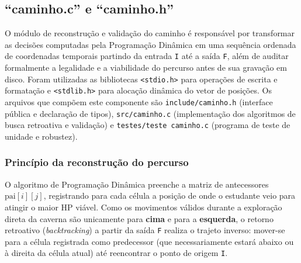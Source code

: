 \documentclass[12pt,a4paper]{article}
\makeatletter
\DeclareRobustCommand{\_}{%
  \ifmmode
    \nfss@text{\textunderscore}%
  \else
    \textunderscore\allowbreak
  \fi
}
\makeatother
\begin{document}

\subsection{``caminho.c'' e ``caminho.h''}

O módulo de reconstrução e validação do caminho é responsável por transformar as decisões computadas pela Programação Dinâmica em uma sequência ordenada de coordenadas temporais partindo da entrada \texttt{I} até a saída \texttt{F}, além de auditar formalmente a legalidade e a viabilidade do percurso antes de sua gravação em disco. Foram utilizadas as bibliotecas \texttt{<stdio.h>} para operações de escrita e formatação e \texttt{<stdlib.h>} para alocação dinâmica do vetor de posições. Os arquivos que compõem este componente são \texttt{include/caminho.h} (interface pública e declaração de tipos), \texttt{src/caminho.c} (implementação dos algoritmos de busca retroativa e validação) e \texttt{testes/teste\_caminho.c} (programa de teste de unidade e robustez).

\subsubsection*{Princípio da reconstrução do percurso}

O algoritmo de Programação Dinâmica preenche a matriz de antecessores $\text{pai}[i][j]$, registrando para cada célula a posição de onde o estudante veio para atingir o maior HP viável. Como os movimentos válidos durante a exploração direta da caverna são unicamente para \textbf{cima} e para a \textbf{esquerda}, o retorno retroativo (\textit{backtracking}) a partir da saída \texttt{F} realiza o trajeto inverso: mover-se para a célula registrada como predecessor (que necessariamente estará abaixo ou à direita da célula atual) até reencontrar o ponto de origem \texttt{I}.
\end{document}
